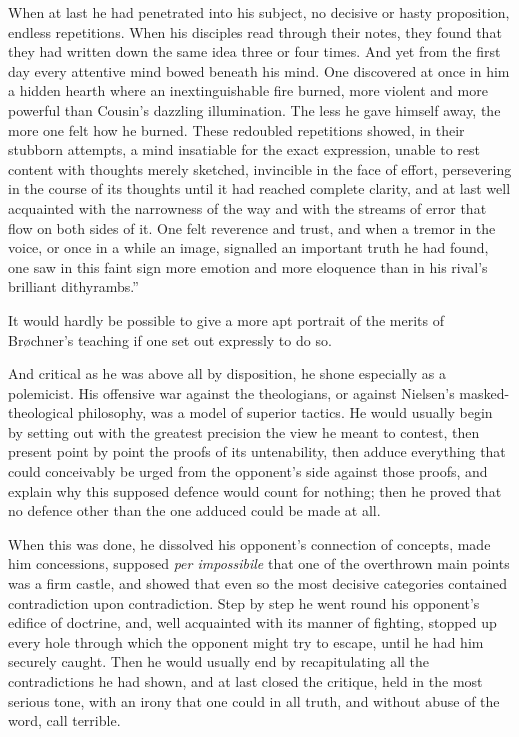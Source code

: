 \documentclass[12pt,a4paper,openany]{book}
\newcommand{\opage}[1]{\marginnote{\footnotesize\textit{[#1]}}}
\begin{document}
When at last he had penetrated into his subject, no decisive or hasty
proposition, endless repetitions. When his disciples read through their notes,
they found that they had written down the same idea three or four times. And
yet from the first day every attentive mind bowed beneath his mind. One
discovered at once in him a hidden hearth where an inextinguishable fire
burned, more violent and more powerful than Cousin's dazzling illumination.
The less he gave himself
\opage{236}away, the more one felt how he burned. These redoubled repetitions showed,
in their stubborn attempts, a mind insatiable for the exact expression, unable
to rest content with thoughts merely sketched, invincible in the face of
effort, persevering in the course of its thoughts until it had reached
complete clarity, and at last well acquainted with the narrowness of the way
and with the streams of error that flow on both sides of it. One felt reverence
and trust, and when a tremor in the voice, or once in a while an image,
signalled an important truth he had found, one saw in this faint sign more
emotion and more eloquence than in his rival's brilliant dithyrambs.''

It would hardly be possible to give a more apt portrait of the merits of
Brøchner's teaching if one set out expressly to do so.

And critical as he was above all by disposition, he shone especially as a
polemicist. His offensive war against the theologians, or against Nielsen's
masked-theological philosophy, was a model of superior tactics. He would
usually begin by setting out with the greatest precision the view he meant to
contest, then present point by point the proofs of its untenability, then
adduce everything
\opage{237}that could conceivably be urged from the opponent's side against those
proofs, and explain why this supposed defence would count for nothing; then he
proved that no defence other than the one adduced could be made at all.

When this was done, he dissolved his opponent's connection of concepts, made
him concessions, supposed \textit{per impossibile} that one of the overthrown
main points was a firm castle, and showed that even so the most decisive
categories contained contradiction upon contradiction. Step by step he went
round his opponent's edifice of doctrine, and, well acquainted with its manner
of fighting, stopped up every hole through which the opponent might try to
escape, until he had him securely caught. Then he would usually end by
recapitulating all the contradictions he had shown, and at last closed the
critique, held in the most serious tone, with an irony that one could in all
truth, and without abuse of the word, call terrible.
\end{document}
